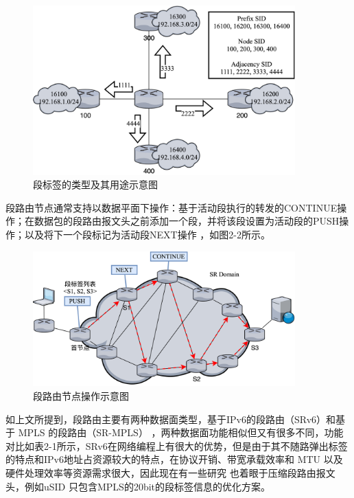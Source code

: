 \begin{figure}[htbp]
\setlength{\abovecaptionskip}{15pt plus 3pt minus 2pt}
\centerline{\includegraphics[width=0.9\textwidth]{./figures/ch2-kinds-of-SID.png}}
\caption{段标签的类型及其用途示意图}
\label{fig-ch2-kinds-of-SID}
\end{figure}

段路由节点通常支持以数据平面下操作：基于活动段执行的转发的CONTINUE操作；在数据包的段路由报文头之前添加一个段，并将该段设置为活动段的PUSH操作；以及将下一个段标记为活动段NEXT操作 \cite{SRARK} ，如图2-2所示。

\begin{figure}[htbp]
\setlength{\abovecaptionskip}{15pt plus 3pt minus 2pt}
\centerline{\includegraphics[width=0.9\textwidth]{./figures/ch2-SR-actions.png}}
\caption{段路由节点操作示意图}
\label{fig-ch2-SR-actions}
\end{figure}

如上文所提到，段路由主要有两种数据面类型，基于IPv6的段路由（SRv6）和基于 \gls*{MPLS} 的段路由（SR-MPLS）\cite{SRMPLS}  ，两种数据面功能相似但又有很多不同，功能对比如表2-1所示，SRv6在网络编程上有很大的优势，但是由于其不随路弹出标签的特点和IPv6地址占资源较大的特点，在协议开销、带宽承载效率和 \gls*{MTU} 以及硬件处理效率等资源需求很大，因此现在有一些研究 \cite{GSID} \cite{MICROSID} \cite{USID} 也着眼于压缩段路由报文头，例如uSID \cite{USID} 只包含MPLS的20bit的段标签信息的优化方案。

